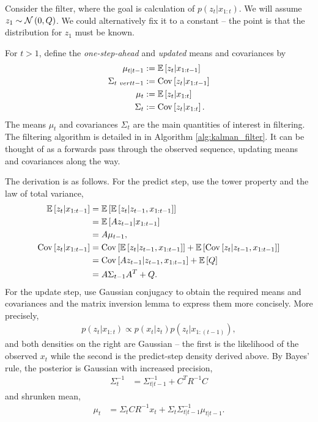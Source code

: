 \documentclass[14pt]{extreport}
\begin{document}
Consider the filter, where the goal is calculation of $p\left(z_{t} \vert
x_{1:t}\right)$. We will assume $z_{1} \sim \mathcal{N}\left(0, Q\right)$. We
could alternatively fix it to a constant -- the point is that the distribution
for $z_{1}$ must be known.

For $t > 1$, define the \textit{one-step-ahead} and \textit{updated} means and
covariances by
\begin{align*}
  \mu_{t \vert t - 1} &:= \mathbb{E}\left[{z_{t} \vert x_{1:t - 1}}\right] \\
  \Sigma_{t \ vert t - 1} &:= \mathrm{Cov}\left[{z_{t} \vert x_{1:t - 1}}\right] \\
  \mu_{t} &:= \mathbb{E}\left[{z_{t} \vert x_{1:t}}\right] \\
  \Sigma_{t} &:= \mathrm{Cov}\left[{z_{t} \vert x_{1:t}}\right].
\end{align*}
The means $\mu_t$ and covariances $\Sigma_{t}$ are the main quantities of
interest in filtering. The filtering algorithm is detailed in in Algorithm
\ref{alg:kalman_filter}. It can be thought of as a forwards pass through the
observed sequence, updating means and covariances along the way.

The derivation is as follows. For the predict step, use the tower property and
the law of total variance,
\begin{align*}
  \mathbb{E}\left[{z_{t} \vert x_{1:t - 1}}\right] &= \mathbb{E}\left[{\mathbb{E}\left[{z_{t} \vert z_{t - 1}, x_{1:t - 1}}\right]}\right] \\
  & = \mathbb{E}\left[{Az_{t - 1}\vert x_{1:t - 1}}\right] \\
  &= A\mu_{t - 1}, \\
  \mathrm{Cov}\left[{z_{t} \vert x_{1:t - 1}}\right] &= \mathrm{Cov}\left[{\mathbb{E}\left[{z_{t} \vert z_{t - 1}, x_{1:t - 1}}\right]}\right] + \mathbb{E}\left[{\mathrm{Cov}\left[{z_{t} \vert z_{t - 1}, x_{1:t - 1}}\right]}\right] \\
  &= \mathrm{Cov}\left[{Az_{t - 1} \vert z_{t - 1}, x_{1:t - 1}}\right] + \mathbb{E}\left[{Q}\right] \\
  &= A\Sigma_{t - 1}A^{T} + Q.
\end{align*}
For the update step, use Gaussian conjugacy to obtain the required means and
covariances and the matrix inversion lemma to express them more concisely.
More precisely,
\begin{align*}
  p\left(z_{t} \vert x_{1:t}\right) \propto p\left(x_{t} \vert z_{t}\right)p\left(z_{t} \vert x_{1:\left(t - 1\right)}\right),
\end{align*}
and both densities on the right are Gaussian -- the first is the likelihood of
the observed $x_{t}$ while the second is the predict-step density derived above.
By Bayes' rule, the posterior is Gaussian with increased precision,
\begin{align}
  \label{eq:sigma_t_inv}
\Sigma_{t}^{-1} &= \Sigma_{t \vert t - 1}^{-1} + C^{T}R^{-1}C
\end{align}
and shrunken mean,
\begin{align}
  \label{eq:mu_t}
\mu_{t} &= \Sigma_{t}CR^{-1}x_{t} + \Sigma_{t}\Sigma_{t \vert t - 1}^{-1} \mu_{t \vert t - 1}.
\end{align}
\end{document}
